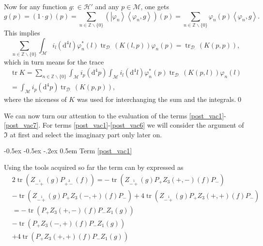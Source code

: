 \documentclass[oneside,reqno,12pt]{amsart}
\makeatletter
\DeclareMathOperator{\tr}{tr}
\newcommand{\Z}[2]{Z_{\stackrel{1}{#1}}\left(#2\right)}
\renewcommand\subsection{\@startsection {subsection}{1}{\z@}%
                                   {-0.5ex \@plus -0.5ex \@minus -.2ex}%
                                   {0.5em}%
                                   {\normalfont\bfseries}}
\makeatother
\begin{document}
Now for any function \(g: \in \mathcal{H}'\) and any \(p\in\mathcal{M}\), one gets
\begin{equation*}
g(p)= (1 \cdot g) (p) = \sum_{n\in\mathbb{Z}\backslash\{0\}}\left( \left| \varphi_n \right> \left< \varphi_n , g \right>\right)(p)= \sum_{n\in\mathbb{Z}\backslash\{0\}} \varphi_n (p) \left< \varphi_n , g \right>
.\end{equation*} 
This implies
\begin{equation*}
 \sum_{n\in\mathbb{Z}\backslash\{0\}}   \int_{\mathcal{M}}i_l \left(\mathrm{d}^4 l\right) \varphi_n^*(l)  \tr_{\mathcal{D}_{\cdot}}(K(l,p)) \varphi_n (p)= \tr_{\mathcal{D}_{\cdot}}(K(p,p)),
\end{equation*}
which in turn means for the trace
\begin{align*}
\tr K =  \sum_{n\in\mathbb{Z}\backslash\{0\}} \int_{\mathcal{M}}i_p \left(\mathrm{d}^4 p\right) \int_{\mathcal{M}}i_l \left(\mathrm{d}^4 l\right) \varphi_n^*(p) \tr_{\mathcal{D}_{\cdot}}(K(p,l)) \varphi_n (l)\\
= \int_{\mathcal{M}}i_p \left(\mathrm{d}^4 p\right) \tr_{\mathcal{D}_{\cdot}}(K(p,p))
,\end{align*} 
 where the niceness of \(K\) was used for interchanging the sum and the integrals.\qed
 
We can now turn our attention to the evaluation of the terms \eqref{post_vac1}-\eqref{post_vac7}. For terms \eqref{post_vac1}-\eqref{post_vac6} we will consider the argument of \(\Im\) at first and select the imaginary part only later on.



\subsection{Term \eqref{post_vac1}}

Using the tools acquired so far the term can by expressed as
\begin{align}\tag*{}
&2\tr\left(\Z{-+}{g}P_{\stackrel{3}{+-}}(f) \right)
=-\tr\left(\Z{-+}{g}P_+ Z_3(+,-)(f) P_- \right)\\\tag*{}
&-\tr\left(\Z{-+}{g}P_+ Z_3(-,+)(f) P_- \right)
+4\tr\left(\Z{-+}{g}P_+ Z_3(+,+)(f) P_- \right)\\\label{post_vac1.1}
&=-\tr\left(P_+ Z_3(+,-)(f) P_- Z_1(g)\right)\\\label{post_vac1.2}
&-\tr\left(P_+ Z_3(-,+)(f) P_- Z_1(g) \right)\\\label{post_vac1.3}
&+4\tr\left(P_+ Z_3(+,+)(f) P_- Z_1(g)\right)
\end{align}
\end{document}
